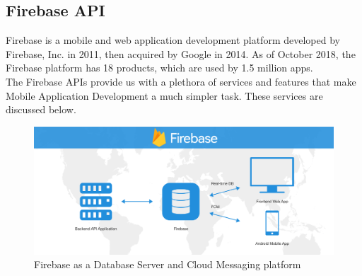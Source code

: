 \documentclass[14pt]{report}
\begin{document}
			\subsection{Firebase API}
				
				Firebase is a mobile and web application development platform developed by Firebase, Inc. in 2011, then acquired by Google in 2014. As of October 2018, the Firebase platform has 18 products, which are used by 1.5 million apps.\\

				The Firebase APIs provide us with a plethora of services and features that make Mobile Application Development a much simpler task. These services are discussed below.
				\begin{figure}[b]
					\includegraphics[width=14cm]{firebaseblog.png}
					\centering
					\caption{Firebase as a Database Server and Cloud Messaging platform}
				\end{figure}
\end{document}
